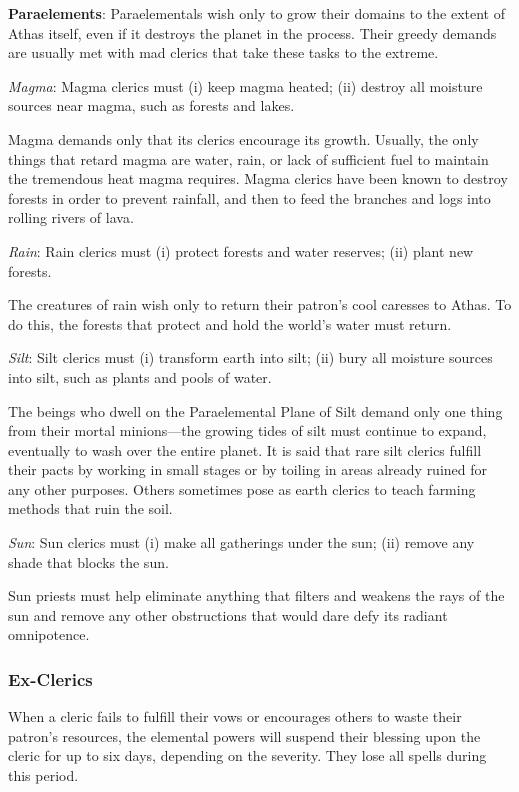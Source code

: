 \textbf{Paraelements}: Paraelementals wish only to grow their domains to the extent of Athas itself, even if it destroys the planet in the process. Their greedy demands are usually met with mad clerics that take these tasks to the extreme.

\textit{Magma}: Magma clerics must
	(i) keep magma heated;
	(ii) destroy all moisture sources near magma, such as forests and lakes.

Magma demands only that its clerics encourage its growth. Usually, the only things that retard magma are water, rain, or lack of sufficient fuel to maintain the tremendous heat magma requires. Magma clerics have been known to destroy forests in order to prevent rainfall, and then to feed the branches and logs into rolling rivers of lava.

\textit{Rain}: Rain clerics must
	(i) protect forests and water reserves;
	(ii) plant new forests.

The creatures of rain wish only to return their patron's cool caresses to Athas. To do this, the forests that protect and hold the world's water must return.

\textit{Silt}: Silt clerics must
	(i) transform earth into silt;
	(ii) bury all moisture sources into silt, such as plants and pools of water.

The beings who dwell on the Paraelemental Plane of Silt demand only one thing from their mortal minions---the growing tides of silt must continue to expand, eventually to wash over the entire planet. It is said that rare silt clerics fulfill their pacts by working in small stages or by toiling in areas already ruined for any other purposes. Others sometimes pose as earth clerics to teach farming methods that ruin the soil.

\textit{Sun}: Sun clerics must
	(i) make all gatherings under the sun;
	(ii) remove any shade that blocks the sun.

Sun priests must help eliminate anything that filters and weakens the rays of the sun and remove any other obstructions that would dare defy its radiant omnipotence.

\subsubsection{Ex-Clerics}
When a cleric fails to fulfill their vows or encourages others to waste their patron's resources, the elemental powers will suspend their blessing upon the cleric for up to six days, depending on the severity. They lose all spells during this period.

